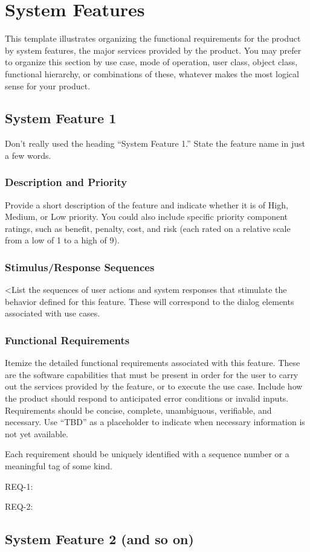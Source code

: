 \chapter{System Features}

This template illustrates organizing the functional requirements for
the product by system features, the major services provided by the
product. You may prefer to organize this section by use case, mode of
operation, user class, object class, functional hierarchy, or
combinations of these, whatever makes the most logical sense for your
product.

\section{System Feature 1}

Don't really used the heading ``System Feature 1.'' State the feature
name in just a few words.

\subsection{Description and Priority}

Provide a
short description of the feature and indicate whether it is of High,
Medium, or Low priority. You could also include specific priority
component ratings, such as benefit, penalty, cost, and risk (each
rated on a relative scale from a low of 1 to a high of 9).

\subsection{Stimulus/Response Sequences}

<List the sequences of user actions and
system responses that stimulate the behavior defined for this
feature. These will correspond to the dialog elements associated with
use cases.

\subsection{Functional Requirements}

Itemize the detailed functional requirements associated with this
feature. These are the software capabilities that must be present in
order for the user to carry out the services provided by the feature,
or to execute the use case. Include how the product should respond to
anticipated error conditions or invalid inputs. Requirements should be
concise, complete, unambiguous, verifiable, and necessary. Use ``TBD''
as a placeholder to indicate when necessary information is not yet
available.


Each requirement should be uniquely identified with a sequence number
or a meaningful tag of some kind.

REQ-1:	

REQ-2:	

\section{System Feature 2 (and so on)}

